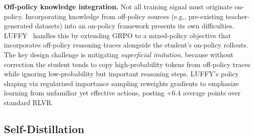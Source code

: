 \documentclass{article} %
\begin{document}
\textbf{Off-policy knowledge integration.} Not all training signal must originate on-policy. Incorporating knowledge from off-policy sources (e.g., pre-existing teacher-generated datasets) into an on-policy framework presents its own difficulties. LUFFY~\citep{2504.14945} handles this by extending GRPO to a mixed-policy objective that incorporates off-policy reasoning traces alongside the student's on-policy rollouts. The key design challenge is mitigating \emph{superficial imitation}, because without correction the student tends to copy high-probability tokens from off-policy traces while ignoring low-probability but important reasoning steps. LUFFY's policy shaping via regularized importance sampling reweights gradients to emphasize learning from unfamiliar yet effective actions, posting +6.4 average points over standard RLVR.

\subsection{Self-Distillation}
\label{subsec:self_distill}
\end{document}
